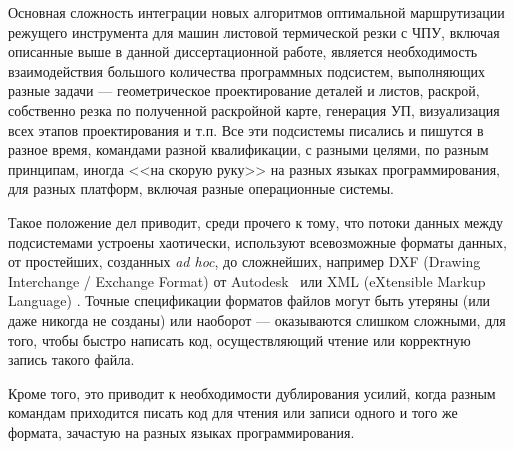 
Основная сложность интеграции
новых алгоритмов оптимальной маршрутизации
режущего инструмента для машин листовой
термической резки с ЧПУ,
включая описанные выше в данной
диссертационной работе,
является необходимость взаимодействия
большого количества программных подсистем,
выполняющих разные задачи ---
геометрическое проектирование деталей и листов,
раскрой,
собственно резка по полученной раскройной карте,
генерация УП,
визуализация всех этапов проектирования и т.п.
Все эти подсистемы писались и пишутся в разное время,
командами разной квалификации,
с разными целями,
по разным принципам,
иногда <<на скорую руку>>
на разных языках программирования,
для разных платформ, включая разные операционные системы.

Такое положение дел приводит,
среди прочего к тому,
что потоки данных между подсистемами устроены хаотически,
используют всевозможные форматы данных,
от простейших, созданных \textit{ad hoc},
до сложнейших,
например DXF
(Drawing Interchange / Exchange  Format)
от Autodesk~\cite{bi:DXF}
или XML
(eXtensible Markup Language)
\cite{bi:XML}.
Точные спецификации форматов файлов
могут быть утеряны
(или даже никогда не созданы)
или наоборот ---
оказываются слишком сложными,
для того, чтобы быстро написать код,
осуществляющий чтение или корректную запись такого файла.

Кроме того,
это приводит к необходимости
дублирования усилий,
когда разным командам приходится
писать код для чтения или записи
одного и того же формата,
зачастую на разных языках программирования.
